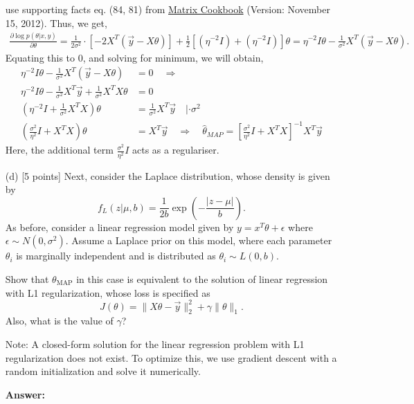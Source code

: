 \documentclass{article}
\begin{document}
\begin{enumerate}
use supporting facts eq. (84, 81) from \href{https://www.math.uwaterloo.ca/~hwolkowi/matrixcookbook.pdf}{Matrix Cookbook} (Version: November 15, 2012). Thus, we get,
\begin{align*}
     \frac{\partial\log p(\theta|x,y) }{\partial\theta} = \frac{1}{2\sigma^2} \cdot \left[-2X^T(\vec{y}-X\theta)\right] + \frac{1}{2}\left[(\eta^{-2}I) + (\eta^{-2}I)\right]\theta = \eta^{-2}I\theta - \frac{1}{\sigma^2}X^T(\vec{y}-X\theta).
\end{align*}
Equating this to 0, and solving for minimum, we will obtain,
\begin{align*}
 \eta^{-2}I\theta - \frac{1}{\sigma^2}X^T\left(\vec{y}-X\theta\right) & = 0\quad\Rightarrow\\[8pt]
 \eta^{-2}I\theta - \frac{1}{\sigma^2}X^T\vec{y} + \frac{1}{\sigma^2}X^TX\theta & = 0 \\[8pt]
 \left(\eta^{-2}I + \frac{1}{\sigma^2}X^TX\right)\theta  & = \frac{1}{\sigma^2}X^T\vec{y}\quad | \cdot \sigma^2 \\[8pt]
  \left(\frac{\sigma^{2}}{\eta^2}I + X^TX\right)\theta & = X^T\vec{y}\quad \Rightarrow \quad
 \boxed{\hat{\theta}_{MAP} =\left[\frac{\sigma^{2}}{\eta^2}I + X^TX \right]^{-1} X^T\vec{y}}
 \end{align*}
Here, the additional term $\frac{\sigma^{2}}{\eta^2}I$ acts as a regulariser.



  \item[(d)] [5 points] Next, consider the Laplace distribution, whose density is given by
  \[
  f_L(z|\mu,b) = \frac{1}{2b} \exp\left(-\frac{|z-\mu|}{b}\right).
  \]
  As before, consider a linear regression model given by $y = x^T\theta + \epsilon$ where $\epsilon \sim N(0,\sigma^2)$. Assume a Laplace prior on this model, where each parameter $\theta_i$ is marginally independent and is distributed as $\theta_i \sim L(0, b)$.

  Show that $\theta_{\text{MAP}}$ in this case is equivalent to the solution of linear regression with L1 regularization, whose loss is specified as
  \[
  J(\theta) = \|X\theta - \vec{y}\|_2^2 + \gamma\|\theta\|_1.
  \]
  Also, what is the value of $\gamma$?

  Note: A closed-form solution for the linear regression problem with L1 regularization does not exist. To optimize this, we use gradient descent with a random initialization and solve it numerically.

\textbf{Answer:}


\end{enumerate}
\end{document}
